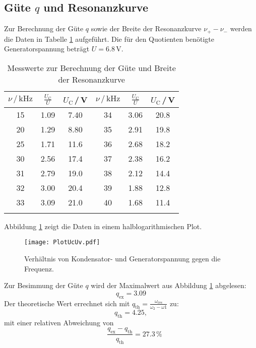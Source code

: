 \subsection{Güte $q$ und Resonanzkurve}
Zur Berechnung der Güte $q$ sowie der Breite der Resonanzkurve $\nu_{+} - \nu_{-}$ werden die Daten in Tabelle \ref{tab:Reso} aufgeführt.
Die für den Quotienten benötigte Generatorspannung beträgt $U=6.8\,\si{\volt}$.
\begin{table}[!h]
  \centering
  \caption{Messwerte zur Berechnung der Güte und Breite der Resonanzkurve}
  \begin{tabular}{ccc||ccc}
    \toprule
    {$\nu\,/\,\si{\kilo\hertz}$} & {$\frac{U_\text{C}}{U}$} & {$U_\text{C}$\,/\,\si{\volt}} &
    {$\nu\,/\,\si{\kilo\hertz}$} & {$\frac{U_\text{C}}{U}$} & {$U_\text{C}$\,/\,\si{\volt}} \\
    \midrule
    15 & 1.09 & 7.40 & 34 & 3.06 & 20.8\\
    20 & 1.29 & 8.80 & 35 & 2.91 & 19.8\\
    25 & 1.71 & 11.6 & 36 & 2.68 & 18.2\\
    30 & 2.56 & 17.4 & 37 & 2.38 & 16.2\\
    31 & 2.79 & 19.0 & 38 & 2.12 & 14.4\\
    32 & 3.00 & 20.4 & 39 & 1.88 & 12.8\\
    33 & 3.09 & 21.0 & 40 & 1.68 & 11.4\\
    \bottomrule
    \label{tab:Reso}
  \end{tabular}
\end{table}
Abbildung \ref{fig:Reso} zeigt die Daten in einem halblogarithmischen Plot.
\begin{figure}[!h]
  \centering
  \texttt{[image: PlotUcUv.pdf]}
  \caption{Verhältnis von Kondensator- und Generatorspannung gegen die Frequenz.}
  \label{fig:Reso}
\end{figure}

Zur Besimmung der Güte $q$ wird der Maximalwert aus Abbildung \ref{fig:Reso} abgelesen:
\begin{equation*}
  q_\text{ex} = 3.09
\end{equation*}
Der theoretische Wert errechnet sich mit $q_\text{th} =\frac{\omega_\text{res}}{\omega_\text{2}-\omega{1}}$ zu:
\begin{equation*}
  q_\text{th} = 4.25,
\end{equation*}
mit einer relativen Abweichung von
\begin{equation*}
\quad\frac{q_\text{ex}-q_\text{th}}{q_\text{th}} = 27.3\,\si{\percent}
\end{equation*}

